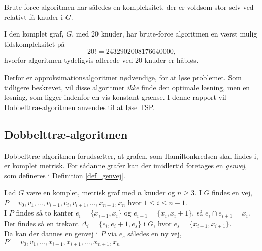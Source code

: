 Brute-force algoritmen har således en kompleksitet, der er voldsom stor selv ved relativt få knuder i $G$.

\begin{exmp}
I den komplet graf, $G$, med $20$ knuder, har brute-force algoritmen en værst mulig tidskompleksitet på $$20! = 2432902008176640000,$$ hvorfor algoritmen tydeligvis allerede ved $20$ knuder er håbløs.
\end{exmp}

Derfor er approksimationsalgoritmer nødvendige, for at løse problemet. Som tidligere beskrevet, vil disse algoritmer \textit{ikke} finde den optimale løsning, men en løsning, som ligger indenfor en vis konstant grænse. I denne rapport vil Dobbelttræ-algoritmen anvendes til at løse TSP. 

\subsection{Dobbelttræ-algoritmen}
Dobbelttræ-algoritmen forudsætter, at grafen, som Hamiltonkredsen skal findes i, er komplet metrisk. For sådanne grafer kan der imidlertid foretages en \textit{genvej}, som defineres i Definition \ref{def_genvej}.

\begin{defn}
Lad $G$ være en komplet, metrisk graf med $n$ knuder og $n \geq 3$. I $G$ findes en vej, $P = v_0, v_1,...,v_{i-1}, v_i, v_{i+1},...,x_{n-1},x_n$ hvor $1 \leq i \leq n-1$. \\
I $P$ findes så to kanter $e_i = \lbrace x_{i-1}, x_i \rbrace$ og $e_{i+1} = \lbrace x_i, x_i+1 \rbrace$, så $e_i \cap e_{i+1} = x_i$.
Der findes så en trekant $\Delta_i = \lbrace e_i, e_i+1, e_s \rbrace$ i $G$, hvor $e_s = \lbrace x_{i-1}, x_{i+1} \rbrace$. \\
Da kan der dannes en genvej i $P$ via $e_s$ således en ny vej, $P'=v_0, v_1,...,x_{i-1},x_{i+1},...,x_{n+1},x_n$
\label{def_genvej}
\end{defn}





